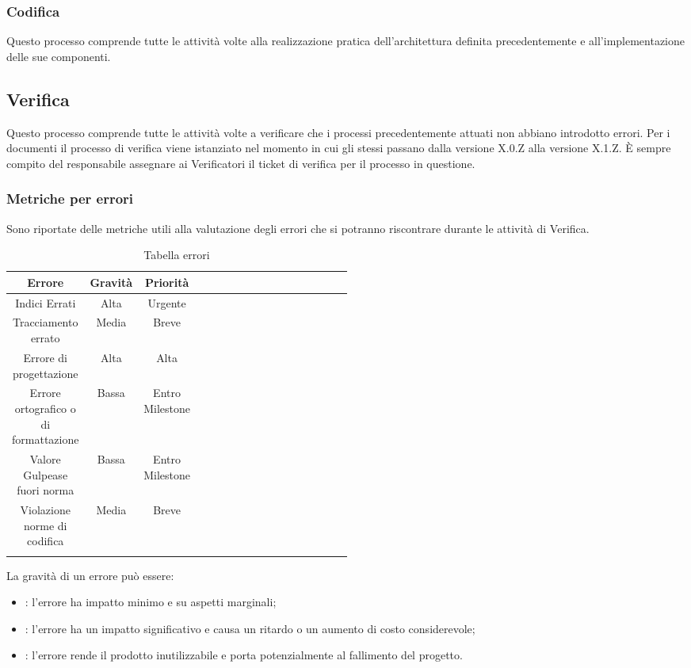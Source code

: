 \subsubsection{Codifica}
Questo processo comprende tutte le attività volte alla realizzazione pratica dell'architettura definita precedentemente e all'implementazione delle sue componenti.
\subsection{Verifica}
Questo processo comprende tutte le attività volte a verificare che i processi precedentemente attuati non abbiano introdotto errori.
Per i documenti il processo di verifica viene istanziato nel momento in cui gli stessi passano dalla versione X.0.Z alla versione X.1.Z. 
È sempre compito del responsabile assegnare ai Verificatori il ticket di verifica per il processo in questione.

\subsubsection{Metriche per errori}
Sono riportate delle metriche utili alla valutazione degli errori che si potranno riscontrare durante le attività di Verifica.
\begin{center}
\begin{longtable}{|c|c|c|p{0.5\linewidth}|}
\toprule
\textbf{Errore} & \textbf{Gravità} & \textbf{Priorità} \\

\midrule
Indici Errati & Alta & Urgente\\
\midrule
Tracciamento errato & Media & Breve\\
\midrule
Errore di progettazione & Alta & Alta\\
\midrule
Errore ortografico o di formattazione & Bassa & Entro Milestone\\
\midrule
Valore Gulpease fuori norma & Bassa & Entro Milestone\\
\midrule
Violazione norme di codifica & Media & Breve\\

\bottomrule
\caption{Tabella errori}
\label{tab:changelog}
\end{longtable}
\end{center}

La gravità di un errore può essere:

\begin{itemize}
\item {}: l'errore ha impatto minimo e su aspetti marginali;
\item {}: l'errore ha un impatto significativo e causa un ritardo o un aumento di costo considerevole;
\item {}: l'errore rende il prodotto inutilizzabile e porta potenzialmente al fallimento del progetto.
\end{itemize}


